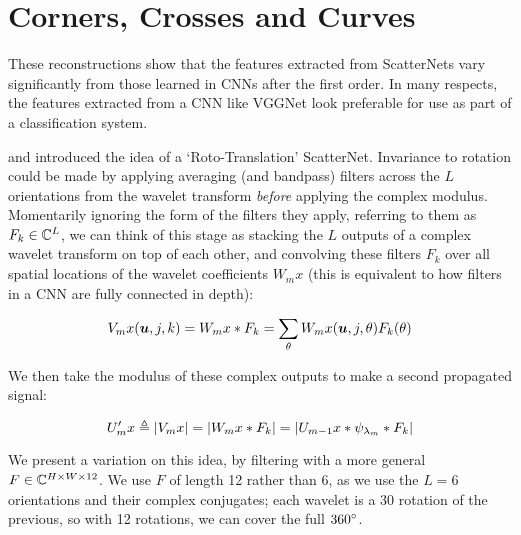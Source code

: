 \section{Corners, Crosses and Curves}
\label{sec:corners}
These reconstructions show that the features extracted from ScatterNets vary
significantly from those learned in CNNs after the first order. In many
respects, the features extracted from a CNN like VGGNet look preferable for use
as part of a classification system.

\cite{sifre_rotation_2013} and \cite{oyallon_deep_2015} introduced the idea of
a `Roto-Translation' ScatterNet. Invariance to rotation could be made by
applying averaging (and bandpass) filters across the $L$ orientations 
from the wavelet transform \emph{before} applying the complex modulus.
Momentarily ignoring the form of the filters they apply, referring to them
as $F_k\in \complexes[L]$, we can think of this stage as stacking the $L$
outputs of a complex wavelet transform on top of each other, and convolving
these filters $F_k$ over all spatial locations of the wavelet coefficients $W_m
x$ (this is equivalent to how filters in a CNN are fully connected
in depth):

\begin{equation}
  V_m x(\bm{u}, j, k) = W_{m}x \conv F_k = \sum_{\theta} W_{m}x(\bm{u}, j, \theta)
F_k(\theta)
\end{equation}

We then take the modulus of these complex outputs to make a second propagated
signal:

\begin{equation}
  U_{m}'x \definedas |V_{m}x| = |W_{m}x \conv F_k| = |U_{m-1}x
  \conv \psi_{\lambda_{m}} \conv F_k|
\end{equation}

We present a variation on this idea, by filtering with a more general 
$F\in \complexes[H\x W\x 12]$. We use $F$ of length 12 rather than 6, as we use
the $L=6$ orientations and their complex conjugates; each wavelet is a 30\degs
rotation of the previous, so with 12 rotations, we can cover the full
$360\degs$. 

